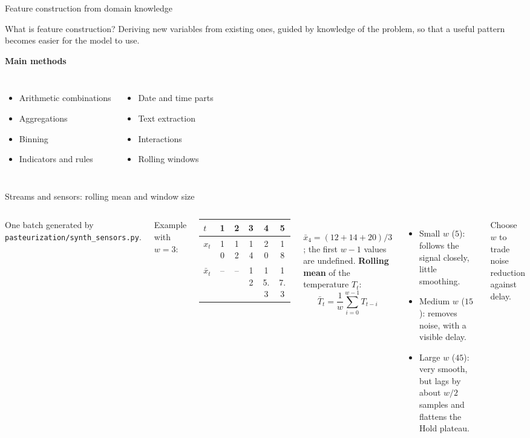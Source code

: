 \begin{frame}{Feature construction from domain knowledge}
\begin{block}{What is feature construction?}
Deriving new variables from existing ones, guided by knowledge of the problem, so that a useful pattern becomes easier for the model to use.
\end{block}
\vspace{0.4em}
\textbf{Main methods}
\begin{columns}[T]
\begin{itemize}
\item Arithmetic combinations
\item Aggregations
\item Binning
\item Indicators and rules
\end{itemize}
\begin{itemize}
\item Date and time parts
\item Text extraction
\item Interactions
\item Rolling windows
\end{itemize}
\end{columns}
\coursefooter
\end{frame}
\begin{frame}{Streams and sensors: rolling mean and window size}
\begin{columns}[T]
\centering
{}

{\tiny One batch generated by \texttt{pasteurization/synth\_sensors.py}.\par}
\vspace{0.3em}
\footnotesize Example with $w=3$:\\[0.2em]
\begin{tabular}{l|ccccc}
$t$ & 1 & 2 & 3 & 4 & 5 \\
\hline
$x_t$ & 10 & 12 & 14 & 20 & 18 \\
$\bar{x}_t$ & -- & -- & 12 & 15.3 & 17.3 \\
\end{tabular}\\[0.2em]
{\scriptsize $\bar{x}_4 = (12+14+20)/3$; the first $w-1$ values are undefined.}
\footnotesize
\textbf{Rolling mean} of the temperature $T_t$:
\[\bar{T}_t = \frac{1}{w}\sum_{i=0}^{w-1} T_{t-i}\]
\begin{itemize}
\item Small $w$ ($5$): follows the signal closely, little smoothing.
\item Medium $w$ ($15$): removes noise, with a visible delay.
\item Large $w$ ($45$): very smooth, but lags by about $w/2$ samples and flattens the Hold plateau.
\end{itemize}
Choose $w$ to trade noise reduction against delay.
\end{columns}
\coursefooter
\end{frame}
